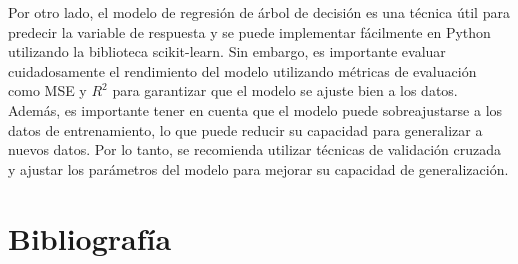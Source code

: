 \documentclass{article}
\begin{document}
Por otro lado, el modelo de regresión de árbol de decisión es una técnica útil para predecir la variable de respuesta y se puede implementar fácilmente en Python utilizando la biblioteca scikit-learn. Sin embargo, es importante evaluar cuidadosamente el rendimiento del modelo utilizando métricas de evaluación como MSE y $R^2$ para garantizar que el modelo se ajuste bien a los datos. Además, es importante tener en cuenta que el modelo puede sobreajustarse a los datos de entrenamiento, lo que puede reducir su capacidad para generalizar a nuevos datos. Por lo tanto, se recomienda utilizar técnicas de validación cruzada y ajustar los parámetros del modelo para mejorar su capacidad de generalización.

\section{Bibliografía}
\end{document}
